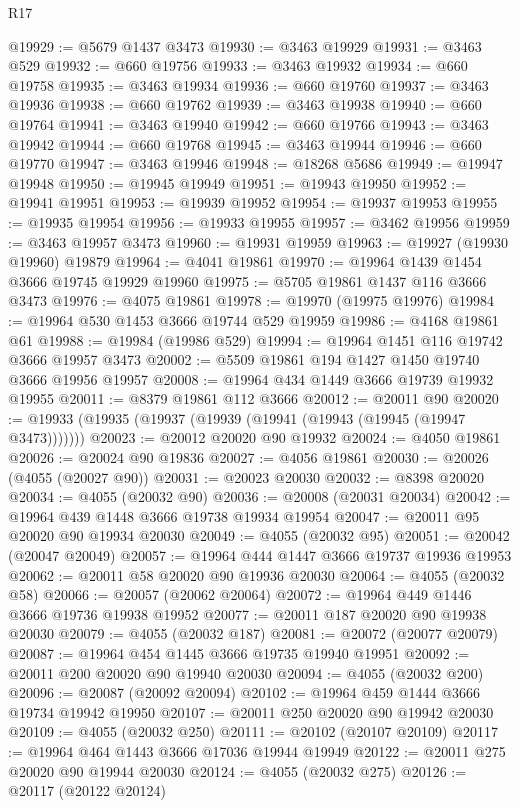 \begin{lexlean}{R17}
\begin{coremodule}
@19929 := @5679 @1437 @3473
@19930 := @3463 @19929
@19931 := @3463 @529
@19932 := @660 @19756
@19933 := @3463 @19932
@19934 := @660 @19758
@19935 := @3463 @19934
@19936 := @660 @19760
@19937 := @3463 @19936
@19938 := @660 @19762
@19939 := @3463 @19938
@19940 := @660 @19764
@19941 := @3463 @19940
@19942 := @660 @19766
@19943 := @3463 @19942
@19944 := @660 @19768
@19945 := @3463 @19944
@19946 := @660 @19770
@19947 := @3463 @19946
@19948 := @18268 @5686
@19949 := @19947 @19948
@19950 := @19945 @19949
@19951 := @19943 @19950
@19952 := @19941 @19951
@19953 := @19939 @19952
@19954 := @19937 @19953
@19955 := @19935 @19954
@19956 := @19933 @19955
@19957 := @3462 @19956
@19959 := @3463 @19957 @3473
@19960 := @19931 @19959
@19963 := @19927 (@19930 @19960) @19879
@19964 := @4041 @19861
@19970 := @19964 @1439 @1454 @3666 @19745 @19929 @19960
@19975 := @5705 @19861 @1437 @116 @3666 @3473
@19976 := @4075 @19861
@19978 := @19970 (@19975 @19976)
@19984 := @19964 @530 @1453 @3666 @19744 @529 @19959
@19986 := @4168 @19861 @61
@19988 := @19984 (@19986 @529)
@19994 := @19964 @1451 @116 @19742 @3666 @19957 @3473
@20002 := @5509 @19861 @194 @1427 @1450 @19740 @3666 @19956 @19957
@20008 := @19964 @434 @1449 @3666 @19739 @19932 @19955
@20011 := @8379 @19861 @112 @3666
@20012 := @20011 @90
@20020 := @19933 (@19935 (@19937 (@19939 (@19941 (@19943 (@19945 (@19947 @3473)))))))
@20023 := @20012 @20020 @90 @19932
@20024 := @4050 @19861
@20026 := @20024 @90 @19836
@20027 := @4056 @19861
@20030 := @20026 (@4055 (@20027 @90))
@20031 := @20023 @20030
@20032 := @8398 @20020
@20034 := @4055 (@20032 @90)
@20036 := @20008 (@20031 @20034)
@20042 := @19964 @439 @1448 @3666 @19738 @19934 @19954
@20047 := @20011 @95 @20020 @90 @19934 @20030
@20049 := @4055 (@20032 @95)
@20051 := @20042 (@20047 @20049)
@20057 := @19964 @444 @1447 @3666 @19737 @19936 @19953
@20062 := @20011 @58 @20020 @90 @19936 @20030
@20064 := @4055 (@20032 @58)
@20066 := @20057 (@20062 @20064)
@20072 := @19964 @449 @1446 @3666 @19736 @19938 @19952
@20077 := @20011 @187 @20020 @90 @19938 @20030
@20079 := @4055 (@20032 @187)
@20081 := @20072 (@20077 @20079)
@20087 := @19964 @454 @1445 @3666 @19735 @19940 @19951
@20092 := @20011 @200 @20020 @90 @19940 @20030
@20094 := @4055 (@20032 @200)
@20096 := @20087 (@20092 @20094)
@20102 := @19964 @459 @1444 @3666 @19734 @19942 @19950
@20107 := @20011 @250 @20020 @90 @19942 @20030
@20109 := @4055 (@20032 @250)
@20111 := @20102 (@20107 @20109)
@20117 := @19964 @464 @1443 @3666 @17036 @19944 @19949
@20122 := @20011 @275 @20020 @90 @19944 @20030
@20124 := @4055 (@20032 @275)
@20126 := @20117 (@20122 @20124)

\end{coremodule}
\end{lexlean}

